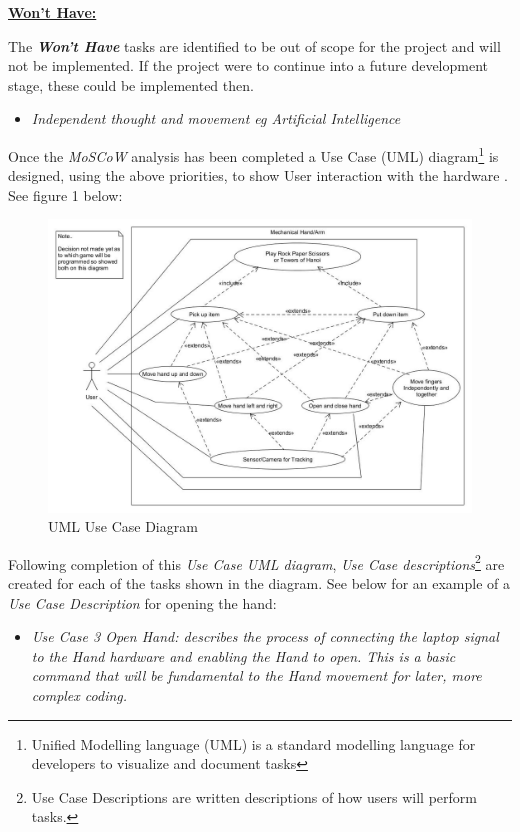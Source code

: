 \documentclass[progress]{cmpreport}
\begin{document}
\textbf{\underline{\large{Won't Have:}}}

The \textbf{\textit{Won't Have}} tasks are identified to be out of scope for the project and will not be implemented. If the project were to continue into a future development stage, these could be implemented then.  

\begin{itemize}		
	\item \textit{Independent thought and movement eg Artificial Intelligence }
\end{itemize}

Once the \textit{MoSCoW} analysis has been completed a Use Case (UML) diagram\footnote{Unified Modelling language (UML) is a standard modelling language for developers to visualize and document tasks} is designed, using the above priorities, to show User interaction with the hardware \citep{AljamaanLBGF14}. See figure 1 below:

\begin{figure}[H] 
	\caption{UML Use Case Diagram }
	\centering
	\includegraphics[width=1 \textwidth, height=0.6 \textheight]{photos/UMLdiagram.jpg}
\end{figure}

Following completion of this \textit{Use Case UML diagram}, \textit{Use Case descriptions}\footnote{Use Case Descriptions are written descriptions of how users will perform tasks.} are created for each of the tasks shown in the diagram. See below for an example of a \textit{Use Case Description} for opening the hand:

\begin{itemize}		
	\item \textit{Use Case 3 Open Hand: describes the process of connecting the laptop signal to the Hand hardware and enabling the Hand to open. This is a basic command that will be fundamental to the Hand movement for later, more complex coding.}
\end{itemize}
\end{document}
